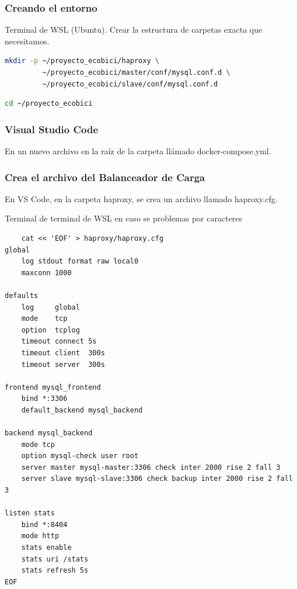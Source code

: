 \documentclass[10pt,a4paper]{article}
\begin{document}
\subsubsection{Creando el entorno}

Terminal de WSL (Ubuntu). Crear la estructura de carpetas exacta que necesitamos.

\begin{lstlisting}[language=bash, caption={Creación de la estructura de directorios}]
mkdir -p ~/proyecto_ecobici/haproxy \
         ~/proyecto_ecobici/master/conf/mysql.conf.d \
         ~/proyecto_ecobici/slave/conf/mysql.conf.d
\end{lstlisting}

\begin{lstlisting}[language=bash]
cd ~/proyecto_ecobici
\end{lstlisting}

\subsubsection{Visual Studio Code}

En un nuevo archivo en la raíz de la carpeta llámado docker-compose.yml.


\subsubsection{Crea el archivo del Balanceador de Carga}

En VS Code, en la carpeta haproxy, se crea un archivo llamado haproxy.cfg.

Terminal de terminal de WSL en caso se problemas por caracteres

\begin{lstlisting}
    cat << 'EOF' > haproxy/haproxy.cfg
global
    log stdout format raw local0
    maxconn 1000

defaults
    log     global
    mode    tcp
    option  tcplog
    timeout connect 5s
    timeout client  300s
    timeout server  300s

frontend mysql_frontend
    bind *:3306
    default_backend mysql_backend

backend mysql_backend
    mode tcp
    option mysql-check user root
    server master mysql-master:3306 check inter 2000 rise 2 fall 3
    server slave mysql-slave:3306 check backup inter 2000 rise 2 fall 3

listen stats
    bind *:8404
    mode http
    stats enable
    stats uri /stats
    stats refresh 5s
EOF
\end{lstlisting}
\end{document}
